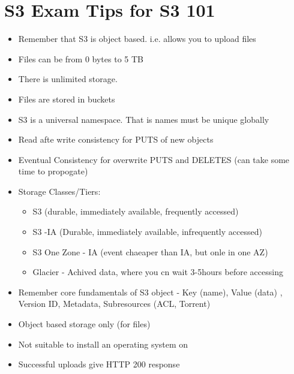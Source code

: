 \documentclass{article}
\begin{document}
\section{S3 Exam Tips for S3 101}
\begin{itemize}
\item
Remember that S3 is object based. i.e. allows you to upload files

\item
Files can be from 0 bytes to 5 TB

\item
There is unlimited storage.

\item
Files are stored in buckets

\item
S3 is a universal namespace. That is names must be unique globally

\item
Read afte write consistency for PUTS of new objects

\item
Eventual Consistency for overwrite PUTS and DELETES (can take some time to propogate)

\item
Storage Classes/Tiers:
	\begin{itemize}
	\item
	S3 (durable, immediately available, frequently accessed)
	
	\item
	S3 -IA (Durable, immediately available, infrequently accessed)
	
	\item
	S3 One Zone - IA (event chaeaper than IA, but onle in one AZ)
	
	\item
	Glacier - Achived data, where you cn wait 3-5hours before accessing
	\end{itemize}

\item
Remember core fundamentals of S3 object - Key (name), Value (data) , Version ID, Metadata, Subresources (ACL, Torrent)

\item
Object based storage only (for files)

\item
Not suitable to install an operating system on

\item
Successful uploads give HTTP 200 response

\end{itemize}
\end{document}
